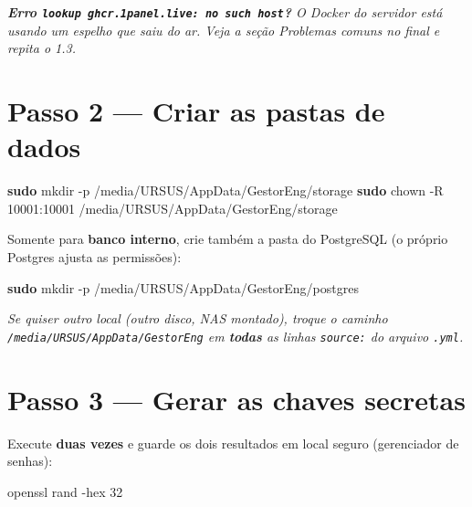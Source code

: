 \documentclass[
  10pt,
]{article}
\newenvironment{Shaded}{\begin{snugshade}}{\end{snugshade}}
\newcommand{\AttributeTok}[1]{\textcolor[rgb]{0.13,0.29,0.53}{#1}}
\newcommand{\ExtensionTok}[1]{#1}
\newcommand{\FunctionTok}[1]{\textcolor[rgb]{0.13,0.29,0.53}{\textbf{#1}}}
\newcommand{\NormalTok}[1]{#1}
\renewenvironment{quote}{\begin{oldquote}\small\itshape}{\end{oldquote}}
\begin{document}
\begin{quote}
\textbf{Erro \texttt{lookup\ ghcr.1panel.live:\ no\ such\ host}?} O
Docker do servidor está usando um espelho que saiu do ar. Veja a seção
\emph{Problemas comuns} no final e repita o 1.3.
\end{quote}

\hypertarget{passo-2-criar-as-pastas-de-dados}{%
\section{Passo 2 --- Criar as pastas de
dados}\label{passo-2-criar-as-pastas-de-dados}}

\begin{Shaded}
\begin{Highlighting}[]
\FunctionTok{sudo}\NormalTok{ mkdir }\AttributeTok{{-}p}\NormalTok{ /media/URSUS/AppData/GestorEng/storage}
\FunctionTok{sudo}\NormalTok{ chown }\AttributeTok{{-}R}\NormalTok{ 10001:10001 /media/URSUS/AppData/GestorEng/storage}
\end{Highlighting}
\end{Shaded}

Somente para \textbf{banco interno}, crie também a pasta do PostgreSQL
(o próprio Postgres ajusta as permissões):

\begin{Shaded}
\begin{Highlighting}[]
\FunctionTok{sudo}\NormalTok{ mkdir }\AttributeTok{{-}p}\NormalTok{ /media/URSUS/AppData/GestorEng/postgres}
\end{Highlighting}
\end{Shaded}

\begin{quote}
Se quiser outro local (outro disco, NAS montado), troque o caminho
\texttt{/media/URSUS/AppData/GestorEng} em \textbf{todas} as linhas
\texttt{source:} do arquivo \texttt{.yml}.
\end{quote}

\hypertarget{passo-3-gerar-as-chaves-secretas}{%
\section{Passo 3 --- Gerar as chaves
secretas}\label{passo-3-gerar-as-chaves-secretas}}

Execute \textbf{duas vezes} e guarde os dois resultados em local seguro
(gerenciador de senhas):

\begin{Shaded}
\begin{Highlighting}[]
\ExtensionTok{openssl}\NormalTok{ rand }\AttributeTok{{-}hex}\NormalTok{ 32}
\end{Highlighting}
\end{Shaded}
\end{document}
